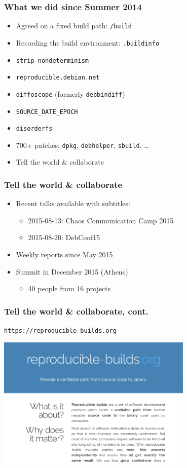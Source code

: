 \documentclass[14pt]{beamer}
\begin{document}
\begin{frame}
 \frametitle{What we did since Summer 2014}

 \begin{itemize}
  \item Agreed on a fixed build path: \texttt{/build}
  \item Recording the build environment: \texttt{.buildinfo}
  \item \texttt{strip-nondeterminism}
  \item \texttt{reproducible.debian.net}
  \item \texttt{diffoscope} (formerly \texttt{debbindiff})
  \item \texttt{SOURCE\_DATE\_EPOCH}
  \item \texttt{disorderfs}
  \item 700+ patches: \texttt{dpkg}, \texttt{debhelper}, \texttt{sbuild}, …
  \item<2> Tell the world \& collaborate
 \end{itemize}
\end{frame}


\begin{frame}
 \frametitle{Tell the world \& collaborate}

 \begin{itemize}
  \item Recent talks available with subtitles:
   \begin{itemize}
    \item 2015-08-13: Chaos Communication Camp 2015
    \item 2015-08-20: DebConf15
   \end{itemize}
  \item Weekly reports since May 2015
  \item Summit in December 2015 (Athens)
   \begin{itemize}
    \item 40 people from 16 projects
   \end{itemize}
 \end{itemize}
\end{frame}

\begin{frame}
 \frametitle{Tell the world \& collaborate, cont.}

 \begin{center}
 \texttt{https://reproducible-builds.org}

 \includegraphics[width=0.7\textwidth]{images/rbwww1.png}
 \end{center}
\end{frame}
\end{document}
